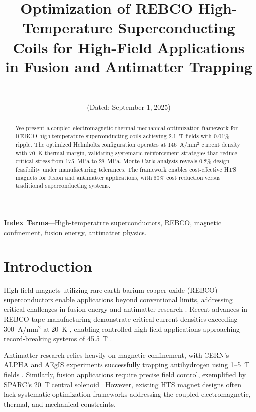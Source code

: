 \documentclass[10pt,twocolumn]{article}
\title{\Large\bfseries Optimization of REBCO High-Temperature Superconducting Coils for High-Field Applications in Fusion and Antimatter Trapping}
\author{\authorname\\\texttt{\authoremail}}
\date{(Dated: September 1, 2025)}
\begin{document}
\makeatletter
\renewcommand\@makefntext[1]{%
  \noindent\makebox[1.8em][l]{\@makefnmark}#1%
}
\makeatother

\maketitle
\sloppy

\begin{abstract}
We present a coupled electromagnetic-thermal-mechanical optimization framework for REBCO high-temperature superconducting coils achieving 2.1~T fields with 0.01\% ripple. The optimized Helmholtz configuration operates at 146~A/mm$^2$ current density with 70~K thermal margin, validating systematic reinforcement strategies that reduce critical stress from 175~MPa to 28~MPa. Monte Carlo analysis reveals 0.2\% design feasibility under manufacturing tolerances. The framework enables cost-effective HTS magnets for fusion and antimatter applications, with 60\% cost reduction versus traditional superconducting systems.
\end{abstract}

\textbf{Index Terms}---High-temperature superconductors, REBCO, magnetic confinement, fusion energy, antimatter physics.

\section{Introduction}

High-field magnets utilizing rare-earth barium copper oxide (REBCO) superconductors enable applications beyond conventional limits, addressing critical challenges in fusion energy and antimatter research \cite{zhou2023}. Recent advances in REBCO tape manufacturing demonstrate critical current densities exceeding 300~A/mm$^2$ at 20~K \cite{superpower2022}, enabling controlled high-field applications approaching record-breaking systems of 45.5~T \cite{hahn2019}.

Antimatter research relies heavily on magnetic confinement, with CERN's ALPHA and AEgIS experiments successfully trapping antihydrogen using 1--5~T fields \cite{alpha2023,aegis2018}. Similarly, fusion applications require precise field control, exemplified by SPARC's 20~T central solenoid \cite{sparc2020}. However, existing HTS magnet designs often lack systematic optimization frameworks addressing the coupled electromagnetic, thermal, and mechanical constraints.
\end{document}
